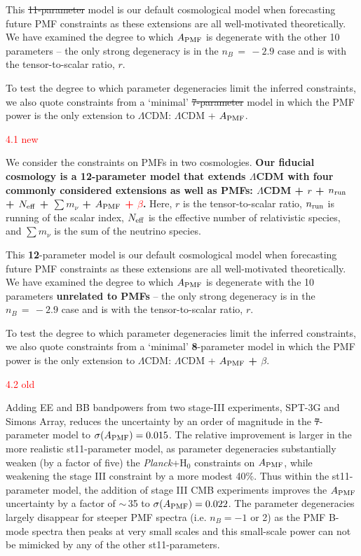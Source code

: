 \documentclass{article}
\newcommand{\apmf}{\ensuremath{A_{\rm PMF}}}
\newcommand{\lcdm}{\ensuremath{\Lambda}CDM}
\newcommand{\nrun}{\ensuremath{n_{\rm run}}}
\newcommand{\neff}{\ensuremath{N_{\rm eff}}}
\newcommand{\ho}{H\ensuremath{_0}}
\newcommand{\mnu}{\ensuremath{\sum m_\nu}}
\newcommand{\planck}{{\sl Planck}}
\newcommand{\sptnew}{SPT-3G}
\newcommand{\simons}{Simons Array}
\newcommand{\changed}[1]{\textcolor{Red}{#1}}
\newcommand{\removed}[1]{\st{#1}}
\newcommand{\added}[1]{\textbf{#1}}
\begin{document}
This \removed{11-parameter} model is our default cosmological model when forecasting future PMF constraints as these extensions are all well-motivated theoretically. 
We have examined the degree to which \apmf{} is degenerate with the other 10 parameters -- the only strong degeneracy is in the $n_B\,=\,-2.9$ case and is with the tensor-to-scalar ratio, $r$. 

To test the degree to which parameter degeneracies limit the inferred constraints,  we also quote constraints from a `minimal' \removed{7-parameter} model in which the PMF power is the only extension to \lcdm{}:  \lcdm{} + \apmf.

\changed{4.1 new}

We consider the constraints on PMFs in two cosmologies. 
\added{Our fiducial cosmology is a \added{12}-parameter model that extends \lcdm{} with  four  commonly considered extensions as well as PMFs:  \lcdm{} +  $r$ + \nrun{} +  \neff{} + \mnu{} + \apmf{} \changed{ + $\beta$}.}
Here, $r$ is the tensor-to-scalar ratio, \nrun{} is running of the scalar index, \neff{} is the effective number of relativistic species, and \mnu{} is the sum of the neutrino species.

This \added{12}-parameter model is our default cosmological model when forecasting future PMF constraints as these extensions are all well-motivated theoretically. 
We have examined the degree to which \apmf{} is degenerate with the 10 parameters \added{unrelated to PMFs} -- the only strong degeneracy is in the $n_B\,=\,-2.9$ case and is with the tensor-to-scalar ratio, $r$. 

To test the degree to which parameter degeneracies limit the inferred constraints,  we also quote constraints from a `minimal' \added{8}-parameter model in which the PMF power is the only extension to \lcdm{}:  \lcdm{} + \apmf{} \added{ + $\beta$}.

\changed{4.2 old}

Adding  EE and BB bandpowers from two stage-III experiments, \sptnew{} and \simons{}, reduces the uncertainty by an order of magnitude in the \st{7}-parameter model to $\sigma(\apmf)=0.015$. 
The relative improvement is larger in the more realistic st{11}-parameter model, as parameter degeneracies substantially weaken (by a factor of five) the \planck+\ho{} constraints on \apmf{}, while weakening the stage III constraint by a  more modest 40\%. 
Thus within the st{11}-parameter model,  the addition of stage III CMB experiments improves the \apmf{} uncertainty by a factor of $\sim$\,35 to  $\sigma(\apmf)=0.022$. 
The parameter degeneracies largely disappear for steeper PMF spectra (i.e. $n_B=-1$ or 2) as the PMF B-mode spectra then peaks at very small scales and this small-scale power can not be mimicked by any of the other st{11}-parameters. 
\end{document}
